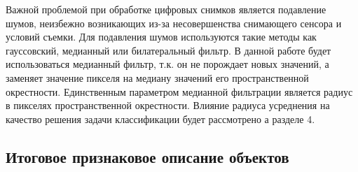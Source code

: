 \documentclass[14pt]{extarticle}
\begin{document}
Важной проблемой при обработке цифровых снимков является подавление шумов,
неизбежно возникающих из-за несовершенства снимающего сенсора и условий съемки.
Для подавления шумов используются такие методы как гауссовский, медианный или билатеральный
фильтр. В данной работе будет использоваться медианный фильтр, т.к. он не порождает новых значений,
а заменяет значение пикселя на медиану значений его пространственной окрестности.
Единственным параметром медианной фильтрации является радиус в пикселях пространственной
окрестности. Влияние радиуса усреднения на качество решения задачи классификации будет рассмотрено
а разделе 4.

\subsection{Итоговое признаковое описание объектов}
\end{document}

